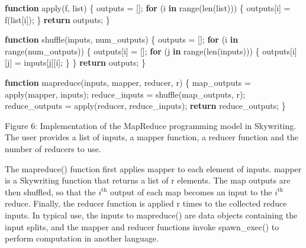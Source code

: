 \documentclass[
]{article}
\newenvironment{Shaded}{}{}
\newcommand{\ControlFlowTok}[1]{\textcolor[rgb]{0.00,0.44,0.13}{\textbf{#1}}}
\newcommand{\FunctionTok}[1]{\textcolor[rgb]{0.02,0.16,0.49}{#1}}
\newcommand{\KeywordTok}[1]{\textcolor[rgb]{0.00,0.44,0.13}{\textbf{#1}}}
\newcommand{\NormalTok}[1]{#1}
\newcommand{\OperatorTok}[1]{\textcolor[rgb]{0.40,0.40,0.40}{#1}}
\begin{document}
\begin{Shaded}
\begin{Highlighting}[]
\KeywordTok{function} \FunctionTok{apply}\NormalTok{(f}\OperatorTok{,}\NormalTok{ list) \{}
\NormalTok{    outputs }\OperatorTok{=}\NormalTok{ []}\OperatorTok{;}
    \ControlFlowTok{for}\NormalTok{ (i }\KeywordTok{in} \FunctionTok{range}\NormalTok{(}\FunctionTok{len}\NormalTok{(list))) \{}
\NormalTok{    outputs[i] }\OperatorTok{=} \FunctionTok{f}\NormalTok{(list[i])}\OperatorTok{;}
\NormalTok{    \}}
    \ControlFlowTok{return}\NormalTok{ outputs}\OperatorTok{;}
\NormalTok{\}}

\KeywordTok{function} \FunctionTok{shuffle}\NormalTok{(inputs}\OperatorTok{,}\NormalTok{ num\_outputs) \{}
\NormalTok{    outputs }\OperatorTok{=}\NormalTok{ []}\OperatorTok{;}
    \ControlFlowTok{for}\NormalTok{ (i }\KeywordTok{in} \FunctionTok{range}\NormalTok{(num\_outputs)) \{}
\NormalTok{    outputs[i] }\OperatorTok{=}\NormalTok{ []}\OperatorTok{;}
    \ControlFlowTok{for}\NormalTok{ (j }\KeywordTok{in} \FunctionTok{range}\NormalTok{(}\FunctionTok{len}\NormalTok{(inputs))) \{}
\NormalTok{    outputs[i][j] }\OperatorTok{=}\NormalTok{ inputs[j][i]}\OperatorTok{;}
\NormalTok{    \}}
\NormalTok{    \}}
    \ControlFlowTok{return}\NormalTok{ outputs}\OperatorTok{;}
\NormalTok{\}}

\KeywordTok{function} \FunctionTok{mapreduce}\NormalTok{(inputs}\OperatorTok{,}\NormalTok{ mapper}\OperatorTok{,}\NormalTok{ reducer}\OperatorTok{,}\NormalTok{ r) \{}
\NormalTok{    map\_outputs }\OperatorTok{=} \FunctionTok{apply}\NormalTok{(mapper}\OperatorTok{,}\NormalTok{ inputs)}\OperatorTok{;}
\NormalTok{    reduce\_inputs }\OperatorTok{=} \FunctionTok{shuffle}\NormalTok{(map\_outputs}\OperatorTok{,}\NormalTok{ r)}\OperatorTok{;}
\NormalTok{    reduce\_outputs }\OperatorTok{=} \FunctionTok{apply}\NormalTok{(reducer}\OperatorTok{,}\NormalTok{ reduce\_inputs)}\OperatorTok{;}
    \ControlFlowTok{return}\NormalTok{ reduce\_outputs}\OperatorTok{;}
\NormalTok{\} }
\end{Highlighting}
\end{Shaded}

Figure 6: Implementation of the MapReduce programming model in
Skywriting. The user provides a list of inputs, a mapper function, a
reducer function and the number of reducers to use.

The mapreduce() function first applies mapper to each element of inputs.
mapper is a Skywriting function that returns a list of r elements. The
map outputs are then shuffled, so that the \(i^{\text{th}}\) output of
each map becomes an input to the \(i^{\text{th}}\) reduce. Finally, the
reducer function is applied r times to the collected reduce inputs. In
typical use, the inputs to mapreduce() are data objects containing the
input splits, and the mapper and reducer functions invoke spawn\_exec()
to perform computation in another language.
\end{document}
